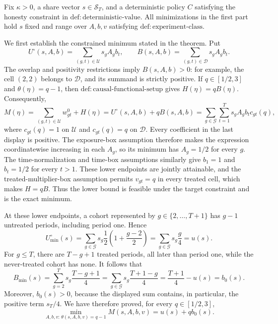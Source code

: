 Fix \(\kappa>0\), a share vector \(s\in\mathcal S_T\), and a deterministic policy \(C\) satisfying the honesty constraint in \(\mathrm{def{:}deterministic\text{-}value}\).  All minimizations in the first part hold \(s\) fixed and range over \(A,b,v\) satisfying \(\mathrm{def{:}experiment\text{-}class}\).

We first establish the constrained minimum stated in the theorem.  Put
\[
 U^{\circ}(s,A,b)=\sum_{(g,t)\in\mathcal U}s_gA_gb_t,
 \qquad
 B(s,A,b)=\sum_{(g,t)\in\mathcal D}s_gA_gb_t.
\]
The overlap and positivity restrictions imply \(B(s,A,b)>0\): for example, the cell \((2,2)\) belongs to \(\mathcal D\), and its summand is strictly positive.  If \(q\in[1/2,3]\) and \(\theta(\eta)=q-1\), then \(\mathrm{def{:}causal\text{-}functional\text{-}setup}\) gives \(H(\eta)=qB(\eta)\).  Consequently,
\[
 M(\eta)
 =\sum_{(g,t)\in\mathcal U}w^0_{gt}+H(\eta)
 =U^{\circ}(s,A,b)+qB(s,A,b)
 =\sum_{g\in\mathcal G}\sum_{t=1}^T
 s_gA_gb_t c_{gt}(q),
 \]
where \(c_{gt}(q)=1\) on \(\mathcal U\) and \(c_{gt}(q)=q\) on \(\mathcal D\).  Every coefficient in the last display is positive.  The exposure-box assumption therefore makes the expression coordinatewise increasing in each \(A_g\), so its minimum has \(A_g=1/2\) for every \(g\).  The time-normalization and time-box assumptions similarly give \(b_1=1\) and \(b_t=1/2\) for every \(t>1\).  These lower endpoints are jointly attainable, and the treated-multiplier-box assumption permits \(v_{gt}=q\) in every treated cell, which makes \(H=qB\).  Thus the lower bound is feasible under the target constraint and is the exact minimum.

At these lower endpoints, a cohort represented by \(g\in\{2,\ldots,T+1\}\) has \(g-1\) untreated periods, including period one.  Hence
\[
 U^{\circ}_{\min}(s)
 =\sum_{g\in\mathcal G}s_g\frac12
 \left(1+\frac{g-2}{2}\right)
 =\sum_{g\in\mathcal G}s_g\frac g4
 =u(s).
\]
For \(g\le T\), there are \(T-g+1\) treated periods, all later than period one, while the never-treated cohort has none.  It follows that
\[
 B_{\min}(s)
 =\sum_{g=2}^{T}s_g\frac{T-g+1}{4}
 =\sum_{g\in\mathcal G}s_g\frac{T+1-g}{4}
 =\frac{T+1}{4}-u(s)
 =b_0(s).
\]
Moreover, \(b_0(s)>0\), because the displayed sum contains, in particular, the positive term \(s_T/4\).  We have therefore proved, for every \(q\in[1/2,3]\),
\[
 \min_{A,b,v:\,\theta(s,A,b,v)=q-1}M(s,A,b,v)
 =u(s)+q b_0(s).
 \tag{1}
\]

